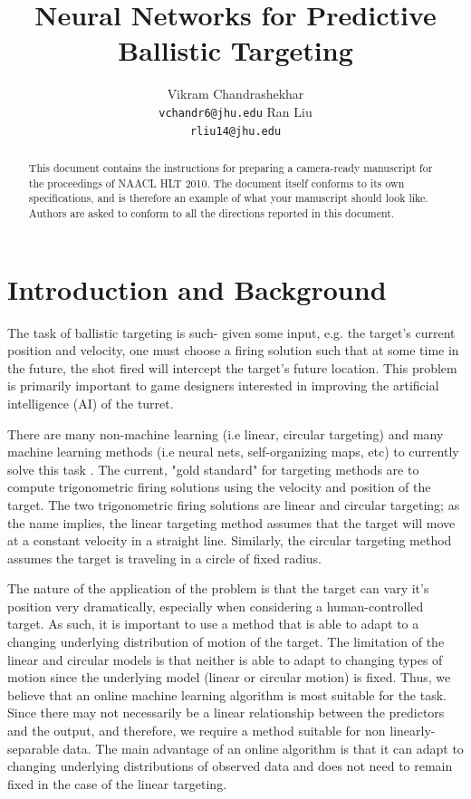 \documentclass[11pt,letterpaper]{article}
\title{Neural Networks for Predictive Ballistic Targeting}
\author{Vikram Chandrashekhar\\
  {\tt vchandr6@jhu.edu}
  \And
  Ran Liu \\
  {\tt rliu14@jhu.edu}}
\date{}
\begin{document}
\maketitle
\begin{abstract}
  This document contains the instructions for preparing a camera-ready
  manuscript for the proceedings of NAACL HLT 2010. The document itself conforms
  to its own specifications, and is therefore an example of what
  your manuscript should look like.  Authors are asked to conform to
  all the directions reported in this document.
\end{abstract}

\section{Introduction and Background}

The task of ballistic targeting is such- given some input, e.g. the target's current position and velocity, one must choose a firing solution such that at some time in the future, the shot fired will intercept the target's future location. This problem is primarily important to game designers interested in improving the artificial intelligence (AI) of the turret.

There are many non-machine learning (i.e linear, circular targeting) and many machine learning methods (i.e neural nets, self-organizing maps, etc) to currently solve this task \cite{Guegsen}. The current, "gold standard" for targeting methods are to compute trigonometric firing solutions using the velocity and position of the target. The two trigonometric firing solutions are linear and circular targeting; as the name implies, the linear targeting method assumes that the target will move at a constant velocity in a straight line. Similarly, the circular targeting method assumes the target is traveling in a circle of fixed radius.

The nature of the application of the problem is that the target can vary it's position very dramatically, especially when considering a human-controlled target. As such, it is important to use a method that is able to adapt to a changing underlying distribution of motion of the target. The limitation of the linear and circular models is that neither is able to adapt to changing types of motion since the underlying model (linear or circular motion) is fixed. Thus, we believe that an online machine learning algorithm is most suitable for the task. Since there may not necessarily be a linear relationship between the predictors and the output, and therefore, we require a method suitable for non linearly-separable data. The main advantage of an online algorithm is that it can adapt to changing underlying distributions of observed data and does not need to remain fixed in the case of the linear targeting.
\end{document}
